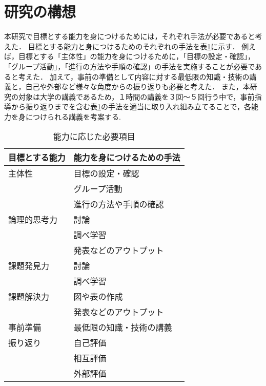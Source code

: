 \documentclass[twocolumn,10pt,a4j]{ltjsarticle}
\begin{document}

\section{研究の構想}
本研究で目標とする能力を身につけるためには，それぞれ手法が必要であると考えた．
目標とする能力と身につけるためのそれぞれの手法を表\ref{table:data_type}に示す．
例えば，目標とする「主体性」の能力を身につけるために，「目標の設定・確認」，「グループ活動」，「進行の方法や手順の確認」の手法を実施することが必要であると考えた．
加えて，事前の準備として内容に対する最低限の知識・技術の講義と，自己や外部など様々な角度からの振り返りも必要と考えた．
また，本研究の対象は大学の講義であるため，１時間の講義を３回〜５回行う中で，事前指導から振り返りまでを含む表\ref{table:data_type}の手法を適当に取り入れ組み立てることで，各能力を身につけられる講義を考案する.

\begin{table}[b]
  \caption{能力に応じた必要項目}
  \label{table:data_type}
  \centering
  \begin{tabular}{ll}
  \hline
    目標とする能力   &  能力を身につけるための手法  \\
    \hline \hline
    主体性  & 目標の設定・確認   \\
    		& グループ活動\\
		& 進行の方法や手順の確認\\ \hline
    論理的思考力  & 討論  \\
    			& 調べ学習  \\
			& 発表などのアウトプット \\ \hline
    課題発見力  &  討論\\
    			&  調べ学習\\ \hline
    課題解決力  &  図や表の作成 \\
    			& 発表などのアウトプット \\ \hline \hline
	
	事前準備  &  最低限の知識・技術の講義 \\ \hline
    	振り返り& 自己評価 \\
			& 相互評価 \\
			& 外部評価 \\
    \hline
  \end{tabular}
\end{table}
\end{document}
